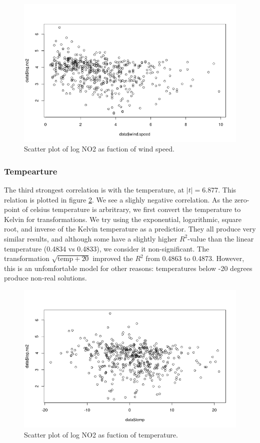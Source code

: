 \documentclass[a4paper, twocolumn]{article}
\begin{document}
\begin{figure}[h!]
    \centering
    \includegraphics[width=0.7\linewidth]{figures/no2_windspeed_vs_no2.png}
    \caption{Scatter plot of log NO2 as fuction of wind speed.}
    \label{fig:no2_windspeed_vs_no2}
\end{figure}


\subsubsection*{Tempearture}
The third strongest correlation is with the temperature, at $|t| = 6.877$. This relation is plotted in figure \ref{fig:no2_temp_vs_no2}. We see a slighly negative correlation. As the zero-point of celsius temperature is arbritrary, we first convert the temperature to Kelvin for transformations. We try using the exponential, logarithmic, square root, and inverse of the Kelvin temperature as a predictior. They all produce very similar results, and although some have a slightly higher $R^2$-value than the linear temperature (0.4834 vs 0.4833), we consider it non-significant. The transformation $\sqrt{\mathrm{temp} + 20}$ improved the $R^2$ from 0.4863 to 0.4873. However, this is an unfomfortable model for other reasons: temperatures below -20 degrees produce non-real solutions.

\begin{figure}[h!]
    \centering
    \includegraphics[width=0.7\linewidth]{figures/no2_temp_vs_no2.png}
    \caption{Scatter plot of log NO2 as fuction of temperature.}
    \label{fig:no2_temp_vs_no2}
\end{figure}
\end{document}
